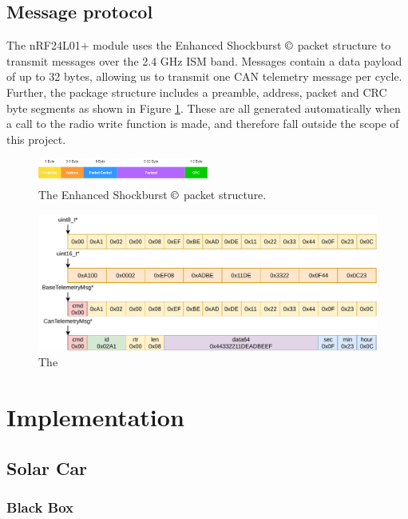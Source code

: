 \documentclass[conference]{IEEEtran}
\begin{document}
\subsection{Message protocol}
The nRF24L01+ module uses the Enhanced Shockburst $\copyright$ packet structure to transmit messages over the 2.4 GHz ISM band. Messages contain a data payload of up to 32 bytes, allowing us to transmit one CAN telemetry message per cycle. Further, the package structure includes a preamble, address, packet and CRC byte segments as shown in Figure \ref{fig:shockburst}. These are all generated automatically when a call to the radio write function is made, and therefore fall outside the scope of this project.   
\begin{figure}[h]
    \centering
    \includegraphics[width=0.5\textwidth]{documentation/images/EnhancedShockburst.png}
    \caption{The Enhanced Shockburst $\copyright$ packet structure.}
    \label{fig:shockburst}
\end{figure}
\begin{figure}
    \centering
    \includegraphics[width=\linewidth]{documentation/images/MessageTypes.pdf}
    \caption{The }
    \label{fig:my_label}
\end{figure}

\section{Implementation}

\subsection{Solar Car} 
\subsubsection{Black Box} %
\end{document}
